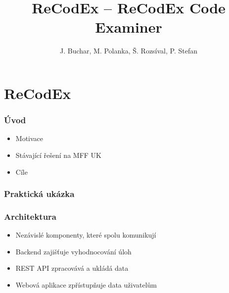 \documentclass{beamer}
\begin{document}

\title[ReCodEx -- ReCodEx Code Examiner] %
{ReCodEx -- ReCodEx Code Examiner}
\author[Buchar, Polanka, Rozsíval, Stefan]{J. Buchar, M. Polanka, Š. Rozsíval, P. Stefan}
\date[3. 12. 2016]{} %
\subject{Computer Science}

\frame{\titlepage}

\section{ReCodEx}

\begin{frame}
	\frametitle{Úvod}
	\begin{itemize}
		\item Motivace
		\item Stávající řešení na MFF UK
		\item Cíle
	\end{itemize}
\end{frame}

\begin{frame}
	\frametitle{Praktická ukázka}
\end{frame}

\begin{frame}
	\frametitle{Architektura}
	\begin{itemize}
		\item Nezávislé komponenty, které spolu komunikují
		\item Backend zajišťuje vyhodnocování úloh
		\item REST API zpracovává a ukládá data
		\item Webová aplikace zpřístupňuje data uživatelům
	\end{itemize}
\end{frame}
\end{document}
